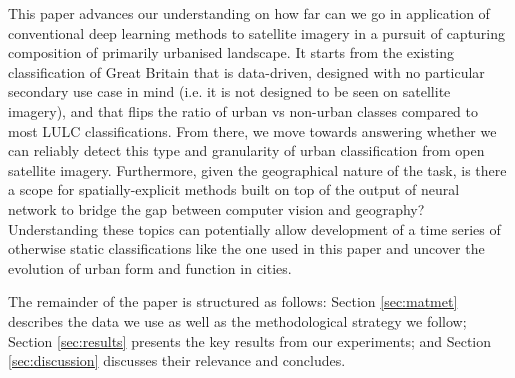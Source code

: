 This paper advances our understanding on how far can we go in application of
conventional deep learning methods to satellite imagery in a pursuit of capturing
composition of primarily urbanised landscape. It starts from the existing classification
of Great Britain that is data-driven, designed with no particular secondary use case in
mind (i.e. it is not designed to be seen on satellite imagery), and that flips the ratio
of urban vs non-urban classes compared to most LULC classifications. From there, we move
towards answering whether we can reliably detect this type and granularity of urban
classification from open satellite imagery. Furthermore, given the geographical nature
of the task, is there a scope for spatially-explicit methods built on top of the output
of neural network to bridge the gap between computer vision and geography? Understanding
these topics can potentially allow development of a time series of otherwise static
classifications like the one used in this paper and uncover the evolution of urban form
and function in cities.

%
The remainder of the paper is structured as follows:
Section \ref{sec:matmet} describes the data we use as well as the
methodological strategy we follow;
Section \ref{sec:results} presents the key results from our experiments;
and Section \ref{sec:discussion} discusses their relevance and concludes.







